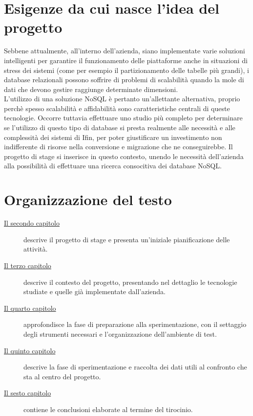 \section{Esigenze da cui nasce l'idea del progetto}

Sebbene attualmente, all'interno dell'azienda, siano implementate varie soluzioni intelligenti per garantire il funzionamento delle piattaforme anche in situazioni di stress dei sistemi (come per esempio il partizionamento delle tabelle più grandi), i database relazionali possono soffrire di problemi di scalabilità quando la mole di dati che devono gestire raggiunge determinate dimensioni.\\
L'utilizzo di una soluzione NoSQL è pertanto un'allettante alternativa, proprio perchè spesso scalabilità e affidabilità sono caratteristiche centrali di queste tecnologie. Occorre tuttavia effettuare uno studio più completo per determinare se l'utilizzo di questo tipo di database si presta realmente alle necessità e alle complessità dei sistemi di Ifin, per poter giustificare un investimento non indifferente di risorse nella conversione e migrazione che ne conseguirebbe.
Il progetto di stage si inserisce in questo contesto, unendo le necessità dell'azienda alla possibilità di effettuare una ricerca consocitiva dei database NoSQL.\\

\section{Organizzazione del testo}

\begin{description}
    \item[{\hyperref[cap:descrizione-stage]{Il secondo capitolo}}] descrive il progetto di stage e presenta un'iniziale pianificazione delle attività.
    
    \item[{\hyperref[cap:contesto]{Il terzo capitolo}}] descrive il contesto del progetto, presentando nel dettaglio le tecnologie studiate e quelle già implementate dall'azienda.
    
    \item[{\hyperref[cap:metodologie]{Il quarto capitolo}}] approfondisce la fase di preparazione alla sperimentazione, con il settaggio degli strumenti necessari e l'organizzazione dell'ambiente di test.
    
    \item[{\hyperref[cap:sperimentazione]{Il quinto capitolo}}] descrive la fase di sperimentazione e raccolta dei dati utili al confronto che sta al centro del progetto.
    
    \item[{\hyperref[cap:conclusioni]{Il sesto capitolo}}] contiene le conclusioni elaborate al termine del tirocinio.
\end{description}